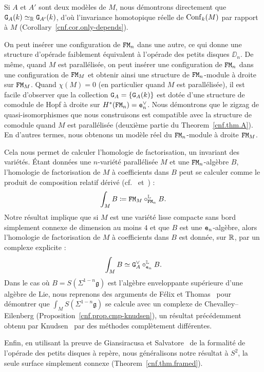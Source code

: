 Si $A$ et $A'$ sont deux modèles de $M$, nous démontrons directement que $\mathtt{G}_{A}(k) \simeq_{\mathbb{R}} \mathtt{G}_{A'}(k)$, d'où l'invariance homotopique réelle de $\operatorname{Conf}_{k}(M)$ par rapport à $M$ (Corollary~\ref{cnf.cor.only-depends}).

On peut insérer une configuration de $\mathtt{FM}_{n}$ dans une autre, ce qui donne une structure d'opérade faiblement équivalent à l'opérade des petits disques $\DD_{n}$.
De même, quand $M$ est parallélisée, on peut insérer une configuration de $\mathtt{FM}_{n}$ dans une configuration de $\mathtt{FM}_{M}$ et obtenir ainsi une structure de $\mathtt{FM}_{n}$-module à droite sur $\mathtt{FM}_{M}$.
Quand $\chi(M) = 0$ (en particulier quand $M$ est parallélisée), il est facile d'observer que la collection $\mathtt{G}_{A} = \{ \mathtt{G}_{A}(k) \}$ est dotée d'une structure de comodule de Hopf à droite sur $H^{*}(\mathtt{FM}_{n}) = \mathtt{e}_{n}^{\vee}$.
Nous démontrons que le zigzag de quasi-isomorphismes que nous construisons est compatible avec la structure de comodule quand $M$ est parallélisée (deuxième partie du Theorem~\ref{cnf.thm.A}).
En d'autres termes, nous obtenons un modèle réel du $\mathtt{FM}_{n}$-module à droite $\mathtt{FM}_{M}$.

Cela nous permet de calculer l'homologie de factorisation, un invariant des variétés.
Étant données une $n$-variété parallélisée $M$ et une $\mathtt{FM}_{n}$-algèbre $B$, l'homologie de factorisation de $M$ à coefficients dans $B$ peut se calculer comme le produit de composition relatif dérivé (cf.~\cite{AyalaFrancis2015} et~\cite[Section 5.1]{Turchin2013}) :
\[ \int_{M} B \coloneqq \mathtt{FM}_{M} \circ_{\mathtt{FM}_{n}}^{\mathbb{L}} B. \]
Notre résultat implique que si $M$ est une variété lisse compacte sans bord simplement connexe de dimension au moins $4$ et que $B$ est une $\mathtt{e}_{n}$-algèbre, alors l'homologie de factorisation de $M$ à coefficients dans $B$ est donnée, sur $\mathbb{R}$, par un complexe explicite :
\[ \int_{M} B \simeq \mathtt{G}_{A}^{\vee} \circ_{\mathtt{e}_{n}}^{\mathbb{L}} B. \]
Dans le cas où $B = S(\Sigma^{1-n} \mathfrak{g})$ est l'algèbre enveloppante supérieure d'une algèbre de Lie, nous reprenons des arguments de Félix et Thomas~\cite{FelixThomas2004} pour démontrer que $\int_{M} S(\Sigma^{1-n} \mathfrak{g})$ se calcule avec un complexe de Chevalley--Eilenberg (Proposition~\ref{cnf.prop.cmp-knudsen}), un résultat précédemment obtenu par Knudsen~\cite{Knudsen2016} par des méthodes complètement différentes.

Enfin, en utilisant la preuve de Giansiracusa et Salvatore~\cite{GiansiracusaSalvatore2010} de la formalité de l'opérade des petits disques à repère, nous généralisons notre résultat à $S^{2}$, la seule surface simplement connexe (Theorem~\ref{cnf.thm.framed}).

